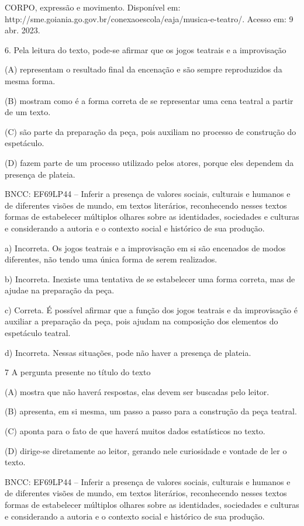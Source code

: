 \begin{itemize}
\begin{itemize}
\begin{escolha}
\begin{escolha}
\begin{escolha}
\begin{escolha}
\begin{escolha}
CORPO, expressão e movimento. Disponível em:
http://sme.goiania.go.gov.br/conexaoescola/eaja/musica-e-teatro/. Acesso
em: 9 abr. 2023.

6. Pela leitura do texto, pode-se afirmar que os jogos teatrais e a
improvisação

(A) representam o resultado final da encenação e são sempre reproduzidos
da mesma forma.

(B) mostram como é a forma correta de se representar uma cena teatral a
partir de um texto.

(C) são parte da preparação da peça, pois auxiliam no processo de
construção do espetáculo.

(D) fazem parte de um processo utilizado pelos atores, porque eles
dependem da presença de plateia.

BNCC: EF69LP44 -- Inferir a presença de valores sociais, culturais e
humanos e de diferentes visões de mundo, em textos literários,
reconhecendo nesses textos formas de estabelecer múltiplos olhares sobre
as identidades, sociedades e culturas e considerando a autoria e o
contexto social e histórico de sua produção.

a) Incorreta. Os jogos teatrais e a improvisação em si são encenados de
modos diferentes, não tendo uma única forma de serem realizados.

b) Incorreta. Inexiste uma tentativa de se estabelecer uma forma
correta, mas de ajudae na preparação da peça.

c) Correta. É possível afirmar que a função dos jogos teatrais e da
improvisação é auxiliar a preparação da peça, pois ajudam na composição
dos elementos do espetáculo teatral.

d) Incorreta. Nessas situações, pode não haver a presença de plateia.

\num{7} A pergunta presente no título do texto

(A) mostra que não haverá respostas, elas devem ser buscadas pelo
leitor.

(B) apresenta, em si mesma, um passo a passo para a construção da peça
teatral.

(C) aponta para o fato de que haverá muitos dados estatísticos no texto.

(D) dirige-se diretamente ao leitor, gerando nele curiosidade e vontade
de ler o texto.

BNCC: EF69LP44 -- Inferir a presença de valores sociais, culturais e
humanos e de diferentes visões de mundo, em textos literários,
reconhecendo nesses textos formas de estabelecer múltiplos olhares sobre
as identidades, sociedades e culturas e considerando a autoria e o
contexto social e histórico de sua produção.


\end{escolha}
\end{escolha}
\end{escolha}
\end{escolha}
\end{escolha}
\end{itemize}
\end{itemize}
